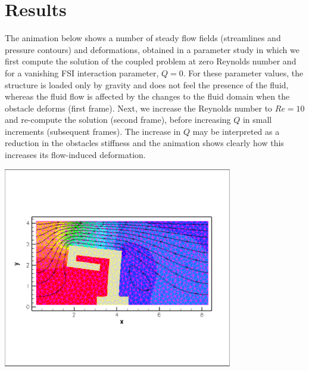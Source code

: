 \hypertarget{index_results}{}\section{Results}\label{index_results}
The animation below shows a number of steady flow fields (streamlines and pressure contours) and deformations, obtained in a parameter study in which we first compute the solution of the coupled problem at zero Reynolds number and for a vanishing F\+SI interaction parameter, $ Q=0 $. For these parameter values, the structure is loaded only by gravity and does not feel the presence of the fluid, whereas the fluid flow is affected by the changes to the fluid domain when the obstacle deforms (first frame). Next, we increase the Reynolds number to $ Re=10$ and re-\/compute the solution (second frame), before increasing $ Q $ in small increments (subsequent frames). The increase in $ Q $ may be interpreted as a reduction in the obstacle\textquotesingle{}s stiffness and the animation shows clearly how this increases its flow-\/induced deformation.

 
\begin{DoxyImage}
\includegraphics[width=0.75\textwidth]{flow}
\end{DoxyImage}




 


